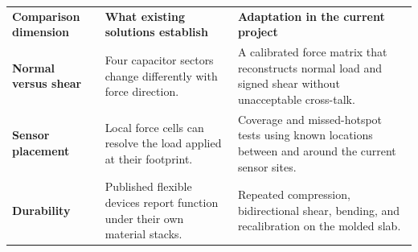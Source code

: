 \vspace{0.75em}
\begingroup
\fontsize{8.9}{10.45}\selectfont
\renewcommand{\arraystretch}{1.14}
\begin{tabularx}{\linewidth}{>{\raggedright\arraybackslash\bfseries\color{AUBRed}}p{2.8cm}Y Y}
\color{white}\textbf{Comparison dimension} &
\color{white}\textbf{What existing solutions establish} &
\color{white}\textbf{Adaptation in the current project} \\
Normal versus shear & Four capacitor sectors change differently with force
direction. & A calibrated force matrix that reconstructs normal load and signed
shear without unacceptable cross-talk. \\
Sensor placement & Local force cells can resolve the load applied at their
footprint. & Coverage and missed-hotspot tests using known locations between
and around the current sensor sites. \\
Durability & Published flexible devices report function under their own
material stacks. & Repeated compression, bidirectional shear, bending, and
recalibration on the molded slab. \\
\end{tabularx}
\endgroup
{}

\vspace{0.5em}

\clearpage
{}

\hypertarget{q2-temperature}{}

